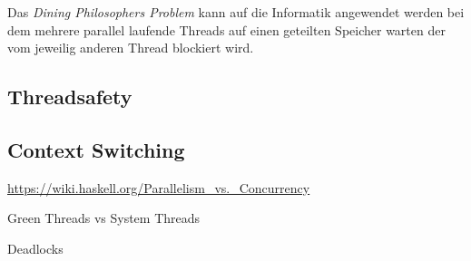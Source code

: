 Das \emph{Dining Philosophers Problem} kann auf die Informatik angewendet werden bei dem mehrere parallel laufende Threads auf einen geteilten Speicher warten der vom jeweilig anderen Thread blockiert wird. 

\subsection{Threadsafety}


\subsection{Context Switching}

\url{https://wiki.haskell.org/Parallelism_vs._Concurrency}

Green Threads vs System Threads

Deadlocks
